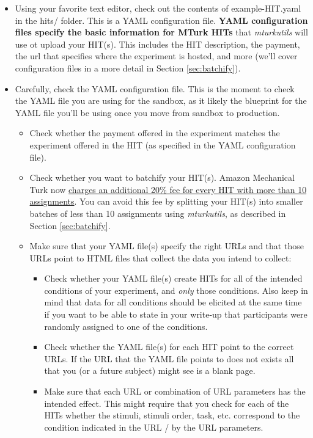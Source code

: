 \documentclass{article}
\begin{document}
\begin{itemize}

   \item Using your favorite text editor, check out the contents of example-HIT.yaml in the hits/ folder. This is a YAML configuration file. {\bf YAML configuration files specify the basic information for MTurk HITs} that {\em mturkutils} will use ot upload your HIT(s). This includes the HIT description, the payment, the url that specifies where the experiment is hosted, and more (we'll cover configuration files in a more detail in Section \ref{sec:batchify}).

   \item Carefully, check the YAML configuration file. This is the moment to check the YAML file you are using for the sandbox, as it likely the blueprint for the YAML file you'll be using once you move from sandbox to production.

\begin{tcolorbox}[colback=gray!5,colframe=blue!40!black,title=Sandbox checklist---{\em before} uploading HIT(s) to sandbox]
  \begin{itemize}
    \item Check whether the payment offered in the experiment matches the experiment offered in the HIT (as specified in the YAML configuration file).
    \item Check whether you want to batchify your HIT(s). Amazon Mechanical Turk now \href{https://requester.mturk.com/pricing}{charges an additional 20\% fee for every HIT with more than 10 assignments}. You can avoid this fee by splitting your HIT(s) into smaller batches of less than 10 assignments using {\em mturkutils}, as described in Section \ref{sec:batchify}.
    \item Make sure that your YAML file(s) specify the right URLs and that those URLs point to HTML files that collect the data you intend to collect:
    \begin{itemize}
      \item Check whether your YAML file(s) create HITs for all of the intended conditions of your experiment, and {\em only} those conditions. Also keep in mind that data for all conditions should be elicited at the same time if you want to be able to state in your write-up that participants were randomly assigned to one of the conditions.
     \item Check whether the YAML file(s) for each HIT point to the correct URLs. If the URL that the YAML file points to does not exists all that you (or a future subject) might see is a blank page.
      \item Make sure that each URL or combination of URL parameters has the intended effect. This might require that you check for each of the HITs whether the stimuli, stimuli order, task, etc. correspond to the condition indicated in the URL / by the URL parameters.
    \end{itemize}
  \end{itemize}
\end{tcolorbox}


\end{itemize}
\end{document}
